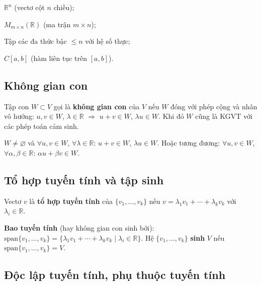 \documentclass[12pt,a4paper]{article}
\begin{document}
\begin{vidu}
  $\mathbb{R}^n$ (vectơ cột $n$ chiều); 
  
  $M_{m \times n}(\mathbb{R})$ (ma trận $m \times n$); 
  
  Tập các đa thức bậc $\le n$ với hệ số thực; 
  
  $C[a,b]$ (hàm liên tục trên $[a,b]$).
\end{vidu}

\subsection{Không gian con}

\begin{dinhnghia}
  Tập con $W \subset V$ gọi là \textbf{không gian con} của $V$ nếu $W$ đóng với phép cộng và nhân vô hướng: $u, v \in W$, $\lambda \in \mathbb{R}$ $\Rightarrow$ $u + v \in W$, $\lambda u \in W$. Khi đó $W$ cũng là KGVT với các phép toán cảm sinh.
\end{dinhnghia}

\begin{phuongphap}[title={Kiểm tra không gian con}]
  $W \ne \varnothing$ và $\forall u, v \in W$, $\forall \lambda \in \mathbb{R}$: $u + v \in W$, $\lambda u \in W$. Hoặc tương đương: $\forall u, v \in W$, $\forall \alpha, \beta \in \mathbb{R}$: $\alpha u + \beta v \in W$.
\end{phuongphap}

\subsection{Tổ hợp tuyến tính và tập sinh}

\begin{dinhnghia}
  Vectơ $v$ là \textbf{tổ hợp tuyến tính} của $\{v_1, \ldots, v_k\}$ nếu $v = \lambda_1 v_1 + \cdots + \lambda_k v_k$ với $\lambda_i \in \mathbb{R}$.
\end{dinhnghia}

\begin{dinhnghia}
  \textbf{Bao tuyến tính} (hay không gian con sinh bởi): $\mathrm{span}\{v_1, \ldots, v_k\} = \{\lambda_1 v_1 + \cdots + \lambda_k v_k \mid \lambda_i \in \mathbb{R}\}$. Hệ $\{v_1, \ldots, v_k\}$ \textbf{sinh} $V$ nếu $\mathrm{span}\{v_1, \ldots, v_k\} = V$.
\end{dinhnghia}

\subsection{Độc lập tuyến tính, phụ thuộc tuyến tính}
\end{document}
